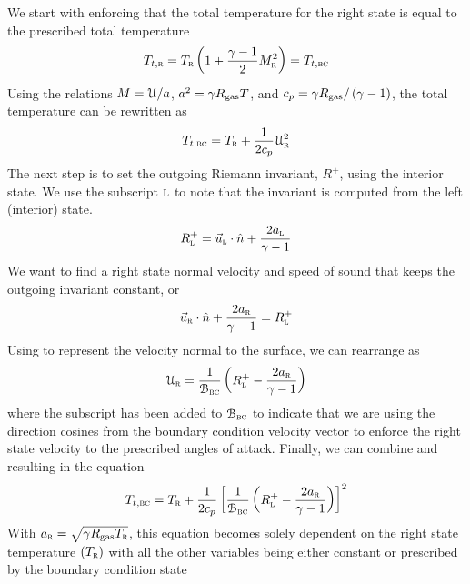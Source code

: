 We start with enforcing that the total temperature for the right state is equal
to the prescribed total temperature
%
\[
  T_{t,\textsc{r}} = T_{\textsc{r}} \left(1 + \frac{\gamma-1}{2}M^2_{\textsc{r}}\right)
              = T_{t,\textsc{bc}}
\]
%
Using the relations $M=\mathcal{U}/a$, $a^2=\gamma R_{\textrm{gas}} T$, and
$c_p=\gamma R_{\textrm{gas}}/\left(\gamma-1\right)$, the total temperature can be rewritten
as
%
\begin{equation}
  T_{t,\textsc{bc}} = T_{\textsc{r}} + \frac{1}{2c_p}\mathcal{U}^2_{\textsc{r}}
  \label{EQ:BC:Inflow:Subsonic1:Ttotal}
\end{equation}
%
The next step is to set the outgoing Riemann invariant, $R^+$, using the
interior state.
%
We use the subscript $\textsc{l}$ to note that the invariant is computed from
the left (interior) state.
%
\begin{equation}
  R^+_{\textsc{l}} = \vec{u}_{\textsc{l}}\cdot\hat{n} + \frac{2a_{\textsc{l}}}{\gamma-1}
  \label{EQ:BC:Inflow:Subsonic1:RplusL}
\end{equation}
%
We want to find a right state normal velocity and speed of sound that keeps the
outgoing invariant constant, or
%
\begin{equation}
  \vec{u}_{\textsc{r}}\cdot\hat{n} + \frac{2a_{\textsc{r}}}{\gamma-1} = R^+_{\textsc{l}}
  \label{EQ:BC:Inflow:Subsonic1:Rplus}
\end{equation}
%
Using  to represent the velocity
normal to the surface, we can rearrange  as
%
\begin{equation}
  \mathcal{U}_{\textsc{r}} = \frac{1}{\mathcal{B}_{\textsc{bc}}}
                \left( R^+_{\textsc{l}} - \frac{2a_{\textsc{r}}}{\gamma-1} \right)
  \label{EQ:BC:Inflow:Subsonic1:vmagR}
\end{equation}
%
where the subscript \subBC{} has been added to $\mathcal{B}_{\textsc{bc}}$ to indicate
that we are using the direction cosines from the boundary condition velocity
vector to enforce the right state velocity to the prescribed angles of attack.
%
Finally, we can combine  and
 resulting in the equation
%
\begin{equation*}
  T_{t,\textsc{bc}} = T_{\textsc{r}} + \frac{1}{2c_p}
    \left[ 
      \frac{1}{\mathcal{B}_{\textsc{bc}}}
      \left( R^+_{\textsc{l}} - \frac{2a_{\textsc{r}}}{\gamma-1} \right)
    \right]^2
\end{equation*}
%
With $a_{\textsc{r}}=\sqrt{\gamma R_{\textrm{gas}} T_{\textsc{r}}}$, this equation becomes solely
dependent on the right state temperature $(T_{\textsc{r}})$ with all the other
variables being either constant or prescribed by the boundary condition state
